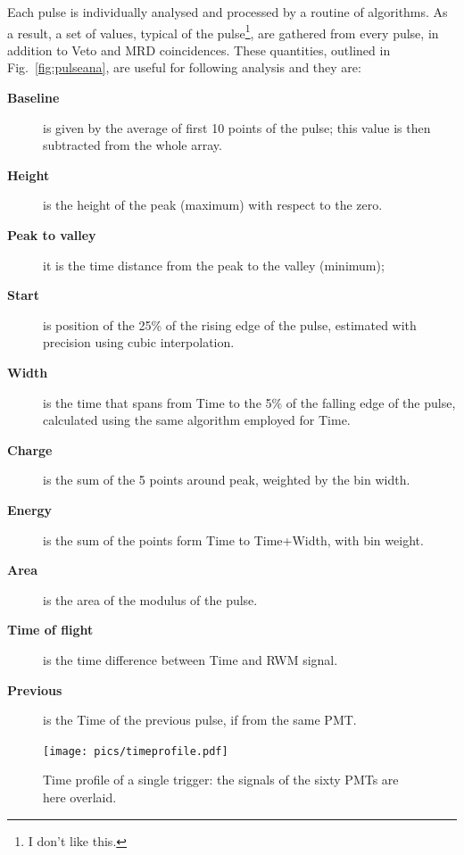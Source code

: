  Each pulse is individually analysed and processed by a routine of algorithms.
 As a result, a set of values, typical of the pulse\footnote{I don't like this.}, are gathered from every pulse, %
 in addition to Veto and MRD coincidences.
 These quantities, outlined in Fig.~\ref{fig:pulseana}, are useful for following analysis and they are:

\begin{description}
  \item[\bfseries Baseline] is given by the average of first 10 points of the pulse; %
    this value is then subtracted from the whole array.
  \item[\bfseries Height] is the height of the peak (maximum) with respect to the zero.
  \item[\bfseries Peak to valley] it is the time distance from the peak to the valley (minimum);
  \item[\bfseries Start] is position of the 25\% of the rising edge of the pulse, estimated with %
    precision using cubic interpolation.
  \item[\bfseries Width] is the time that spans from Time to the 5\% of the falling edge %
    of the pulse, calculated using the same algorithm employed for Time.
  \item[\bfseries Charge] is the sum of the 5 points around peak, weighted by the bin width.
  \item[\bfseries Energy] is the sum of the points form Time to Time+Width, with bin weight.
  \item[\bfseries Area] is the area of the modulus of the pulse.
  \item[\bfseries Time of flight] is the time difference between Time and RWM signal.
  \item[\bfseries Previous] is the Time of the previous pulse, if from the same PMT.
    \color{red}
\end{description}


 \begin{figure}
   \centering
   \texttt{[image: pics/timeprofile.pdf]}
   \caption{Time profile of a single trigger: the signals of the sixty PMTs are here overlaid.}
   \label{fig:profile}
 \end{figure}

